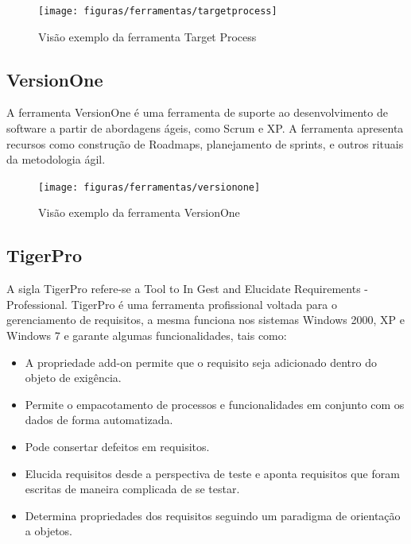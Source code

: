 \begin{figure}[!htpb]
\centering
\texttt{[image: figuras/ferramentas/targetprocess]}
\caption{Visão exemplo da ferramenta Target Process}
\end{figure}


\subsection{VersionOne}
A ferramenta VersionOne é uma ferramenta de suporte ao desenvolvimento de software a partir de abordagens ágeis, como Scrum e XP.
A ferramenta apresenta recursos como construção de Roadmaps, planejamento de sprints, e outros rituais da metodologia ágil.

\begin{figure}[!htpb]
\centering
\texttt{[image: figuras/ferramentas/versionone]}
\caption{Visão exemplo da ferramenta VersionOne}
\end{figure}

\subsection{TigerPro}

A sigla TigerPro refere-se a Tool to In Gest and Elucidate Requirements - Professional.
TigerPro é uma ferramenta profissional voltada para o gerenciamento de requisitos, a mesma funciona nos sistemas Windows 2000, XP e Windows 7 e garante algumas funcionalidades, tais como:
\begin{itemize}
\item A propriedade add-on permite que o requisito seja adicionado dentro do objeto de exigência.
\item Permite o empacotamento de processos e funcionalidades em conjunto com os dados de forma automatizada.
\item Pode consertar defeitos em requisitos.
\item Elucida requisitos desde a perspectiva de teste e aponta requisitos que foram escritas de maneira complicada de se testar.
\item Determina propriedades dos requisitos seguindo um paradigma de orientação a objetos.
\end{itemize}


